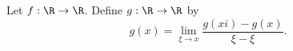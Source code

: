 


Let $f: \R \to \R$.
Define $g: \R \to \R$ by
\[
  g(x) = \lim_{\xi \to x} \frac{g(xi) - g(x)}{\xi - \xi}.
\]
